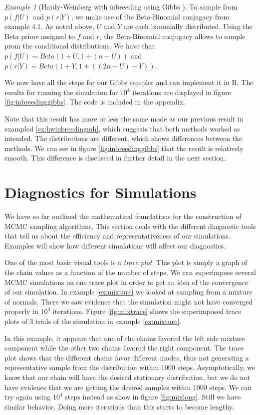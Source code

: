 \documentclass[11pt]{amsart}
\theoremstyle{theorem} %
\theoremstyle{definition}                  %
\theoremstyle{example}                       %
\theoremstyle{remark}                       %
\newtheorem{exmp}[thm]{Example}  %
\numberwithin{equation}{section}
\begin{document}
\begin{exmp}[{Hardy-Weinberg with inbreeding using Gibbs \cite{stephens}}]
To sample from $p(f|U)$ and $p(r|Y)$, we make use of the Beta-Binomial conjugacy from example 4.1. As noted above, $U$ and $Y$ are each binomially distributed. Using the Beta priors assigned to $f$ and $r$, the Beta-Binomial conjugacy allows to sample prom the conditional distributions. We have that $p(f|U)\sim Beta(1+U, 1+(n-U))$ and $p(r|Y)\sim Beta(1+Y, 1+((2n-U)-Y))$.

We now have all the steps for our Gibbs sampler and can implement it in R. The results for running the simulation for $10^4$ iterations are displayed in figure \ref{fig:inbreedinggibbs}. The code is included in the appendix.

Note that this result has more or less the same mode as our previous result in exampled \ref{ex:hwinbreedingmh}, which suggests that both methods worked as intended. The distributions are different, which shows differences between the methods. We can see in figure \ref{fig:inbreedinggibbs} that the result is relatively smooth. This difference is discussed in further detail in the next section.
\end{exmp}

\section{Diagnostics for Simulations}

We have so far outlined the mathematical foundations for the construction of MCMC sampling algorithms. This section deals with the different diagnostic tools that tell us about the efficiency and representativeness of our simulations. Examples will show how different simulations will affect our diagnostics.

One of the most basic visual tools is a {\em trace plot}\cite[p.179]{dogs}. This plot is simply a graph of the chain values as a function of the number of steps. We can superimpose several MCMC simulations on one trace plot in order to get an idea of the convergence of our simulation. In example \ref{ex:mixture} we looked at sampling from a mixture of normals. There we saw evidence that the simulation might not have converged properly in $10^3$ iterations. Figure \ref{fig:mixtrace} shows the superimposed trace plots of 3 trials of the simulation in example \ref{ex:mixture}.

In this example, it appears that one of the chains favored the left side mixture component while the other two chains favored the right component. The trace plot shows that the different chains favor different modes, thus not generating a representative sample from the distribution within 1000 steps. Asymptotically, we know that our chain will have the desired stationary distribution, but we do not have evidence that we are getting the desired samples within 1000 steps. We can try again using $10^4$ steps instead as show in figure \ref{fig:mixlong}. Still we have similar behavior. Doing more iterations than this starts to become lengthy.
\end{document}
